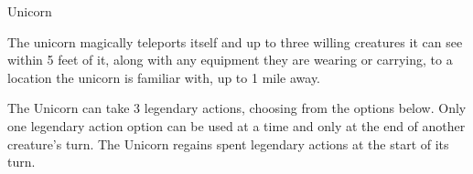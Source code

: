 \begin{DndMonster}[float*=b,width=\textwidth + 8pt]{Unicorn}
\begin{multicols}{2}
The unicorn magically teleports itself and up to three willing creatures it can see within 5 feet of it, along with any equipment they are wearing or carrying, to a location the unicorn is familiar with, up to 1 mile away.


The Unicorn can take 3 legendary actions, choosing from the options below. Only one legendary action option can be used at a time and only at the end of another creature's turn. The Unicorn regains spent legendary actions at the start of its turn.

\begin{DndMonsterLegendaryActions}
\end{DndMonsterLegendaryActions}
\end{multicols}
\end{DndMonster}

\FloatBarrier